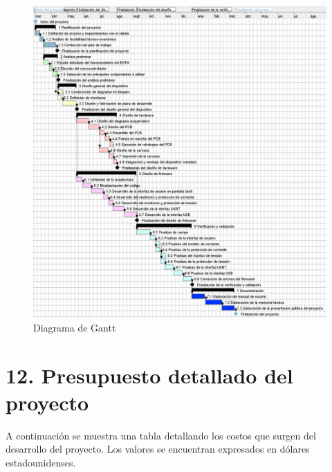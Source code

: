 \documentclass[
11pt, %
codirector, %
]{charter}
\begin{document}
\begin{figure}[htpb]
\centering 
\includegraphics[height=.7\textheight]{./Figuras/Gantt_Diag.png}
\caption{Diagrama de Gantt}
\label{fig:Gantt_Diag}
\end{figure}

\section{12. Presupuesto detallado del proyecto}
\label{sec:presupuesto}

A continuación se muestra una tabla detallando los costos que surgen del desarrollo del proyecto. Los valores se encuentran expresados en dólares estadounidenses.
\end{document}

